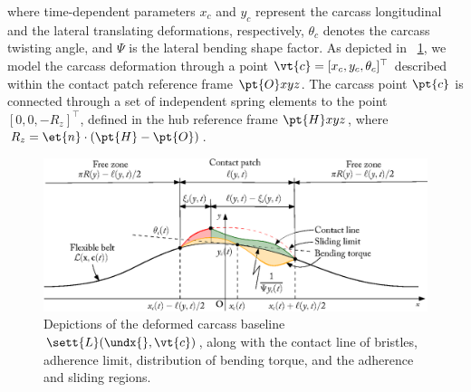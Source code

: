 %
where time-dependent parameters $x_c$ and $y_c$ represent the carcass longitudinal and the lateral translating deformations, respectively, $\theta_c$ denotes the carcass twisting angle, and $\Psi$ is the lateral bending shape factor. As depicted in \figurename~\ref{app3:fig:contact_patch}, we model the carcass deformation through a point $\vt{c} = [x_c, y_c, \theta_c]^\top$ described within the contact patch reference frame $\pt{O}xyz$. The carcass point $\pt{c}$ is connected through a set of independent spring elements to the point $\left[0, 0, -R_z\right]^\top$, defined in the hub reference frame $\pt{H}xyz$, where $R_z = \et{n} \cdot (\pt{H}-\pt{O})$.

\begin{figure}[htb]
  \centering
  \includegraphics[width=\linewidth]{figures/appendix_3/contact_patch}
  \caption{Depictions of the deformed carcass baseline $\sett{L}(\undx{}, \vt{c})$, along with the contact line of bristles, adherence limit, distribution of bending torque, and the adherence and sliding regions.}
  \label{app3:fig:contact_patch}
\end{figure}

